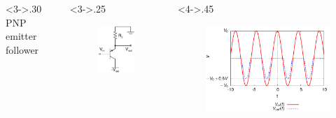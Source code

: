 \documentclass[beamer]{standalone}
\begin{document}
{\begin{columns}[c]
\begin{column}
\begin{figure}
		\end{figure}
	\end{column}
\end{columns}
\begin{columns}[c]
	\begin{column}<3->{.30\textwidth}
		PNP emitter follower
	\end{column}
	\begin{column}<3->{.25\textwidth}
		\begin{figure}
			\includegraphics[height=0.30\textheight]{./schematics/pnp_emitter_follower}
		\end{figure}
	\end{column}
	\begin{column}<4->{.45\textwidth}
		\begin{figure}
			\includegraphics[width=1.00\textwidth,angle=0]{./plots/pnp_follower}
		\end{figure}
	\end{column}
\end{columns}
	}
\end{document}
